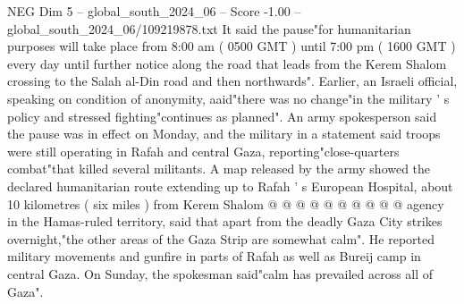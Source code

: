\begin{textsample}{NEG Dim 5 – global\_south\_2024\_06 – Score -1.00 – global\_south\_2024\_06/109219878.txt}
It said the pause"for humanitarian purposes will take place from 8:00 am ( 0500 GMT ) until 7:00 pm ( 1600 GMT ) every day until further notice along the road that leads from the Kerem Shalom crossing to the Salah al-Din road and then northwards".
Earlier, an Israeli official, speaking on condition of anonymity, aaid"there was no change"in the military ' s policy and stressed fighting"continues as planned".
An army spokesperson said the pause was in effect on Monday, and the military in a statement said troops were still operating in Rafah and central Gaza, reporting"close-quarters combat"that killed several militants.
A map released by the army showed the declared humanitarian route extending up to Rafah ' s European Hospital, about 10 kilometres ( six miles ) from Kerem Shalom @ @ @ @ @ @ @ @ @ @ agency in the Hamas-ruled territory, said that apart from the deadly Gaza City strikes overnight,"the other areas of the Gaza Strip are somewhat calm".
He reported military movements and gunfire in parts of Rafah as well as Bureij camp in central Gaza.
On Sunday, the spokesman said"calm has prevailed across all of Gaza".

\end{textsample}
